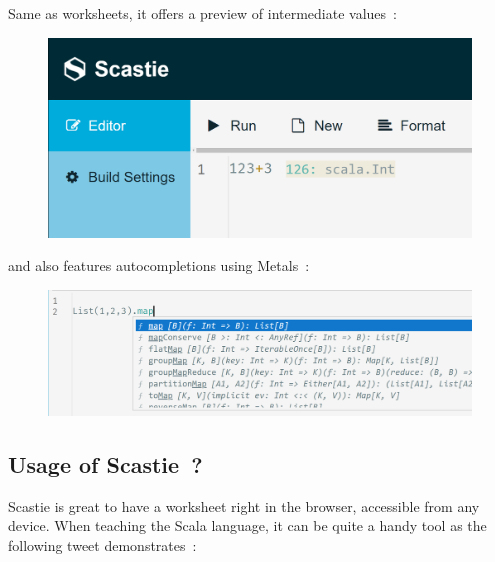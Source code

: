 \documentclass{article}
\begin{document}
Same as worksheets, it offers a preview of intermediate values~:

\begin{figure}[H]
    \centering
    \includegraphics[width=0.7\columnwidth]{scastie_instrumentation.png}
\end{figure}

and also features autocompletions using Metals~:

\begin{figure}[H]
    \centering
    \includegraphics[width=0.7\columnwidth]{scastie_autocomplete.png}
\end{figure}

\subsection{Usage of Scastie~?}

Scastie is great to have a worksheet right in the browser, accessible from any device.
When teaching the Scala language, it can be quite a handy tool as the following tweet demonstrates~:
\end{document}
